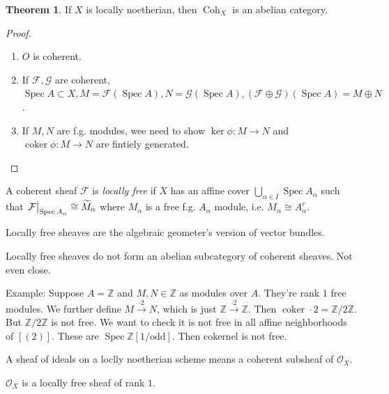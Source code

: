 \documentclass{article}
\theoremstyle{definition}
\newtheorem{theorem}{Theorem}
\begin{document}
    \begin{theorem}
        If \(X\) is locally noetherian, then \(\operatorname{Coh}_X\) is an abelian category.
    \end{theorem}

    \begin{proof}
        \begin{enumerate}[label=\arabic*)]
            \item \(O\) is coherent.
            \item If \(\mathcal{F}, \mathcal{G}\) are coherent, \(\operatorname{Spec} A \subset X, M = \mathcal{F} (\operatorname{Spec} A), N = \mathcal{G} (\operatorname{Spec} A), (\mathcal{F} \oplus \mathcal{G}) (\operatorname{Spec} A) = M \oplus N\).
            \item If \(M, N\) are f.g. modules, wee need to show \(\ker \phi : M \to N\) and \(\operatorname{coker} \phi : M \to N\) are fintiely generated.
            
        \end{enumerate} 
    \end{proof}

    A coherent sheaf \(\mathcal{F}\) is \textit{locally free} if \(X\) has an affine cover \(\bigcup_{\alpha \in I} \operatorname{Spec} A_\alpha\) such that \(\eval{\mathcal{F}}_{\operatorname{Spec} A_\alpha} \cong \widetilde{M}_\alpha\) where \(M_\alpha\) is a free f.g. \(A_\alpha\) module, i.e. \(M_\alpha \cong A_\alpha^r\).

    Locally free sheaves are the algebraic geometer's version of vector bundles. 

    Locally free sheaves do not form an abelian subcategory of coherent sheaves. Not even close.

    Example: Suppose \(A = \mathbb{Z}\) and \(M, N \in \mathbb{Z}\) as modules over \(A\). They're rank \(1\) free modules. We further define \(M \xrightarrow{\cdot 2} N\), which is just \(\mathbb{Z} \xrightarrow{\cdot 2} \mathbb{Z}\). Then \(\operatorname{coker} \cdot 2 = \mathbb{Z} / 2 \mathbb{Z}\). But \(\mathbb{Z} / 2 \mathbb{Z}\) is not free. We want to check it is not free in all affine neighborhoods of \([(2)]\). These are \(\operatorname{Spec} \mathbb{Z}[1 / \text{odd}]\). Then cokernel is not free.

    A sheaf of ideals on a loclly noetherian scheme means a coherent subsheaf of \(\mathcal{O}_X\). 

    \(\mathcal{O}_X\) is a locally free sheaf of rank \(1\).
\end{document}
